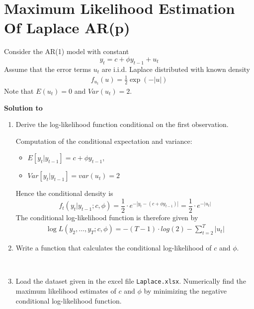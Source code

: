 \documentclass[a4paper]{scrartcl}
\begin{document}
    \section[Maximum Likelihood Estimation Of Laplace AR(p)]{Maximum Likelihood Estimation Of Laplace AR(p)}\label{ex:MLARpLaPlace}
    Consider the AR(1) model with constant
    $$ y_t = c + \phi y_{t-1} + u_t$$
    Assume that the error terms $u_t$ are i.i.d. Laplace distributed with known density
    \begin{align*}
        f_{u_{t}}(u)=\frac{1}{2}\exp \left( -|u|\right)
    \end{align*}
    Note that $E(u_t)=0$ and $Var(u_t)=2$.
    \begin{solution}\textbf{Solution to }\end{solution}
    \begin{enumerate}
        \item Derive the log-likelihood function conditional on the first observation.
              \begin{solution}
                  Computation of the conditional expectation and variance:
                  \begin{itemize}
                      \item $E[y_{t}|y_{t-1}] =
                                c + \phi y_{t-1} $,
                      \item $Var[y_{t}|y_{t-1}] = var(u_t) = 2$
                  \end{itemize}
                  Hence the conditional density is
                  \begin{displaymath}
                      f_t(y_{t}|y_{t-1}; c, \phi) = \frac{1}{2} \cdot e^{-|y_{t} -(c + \phi y_{t-1})|} = \frac{1}{2} \cdot e^{-|u_t|}
                  \end{displaymath}
                  The conditional log-likelihood function is therefore given by
                  \begin{eqnarray*}
                      \log L(y_{2}, \dots, y_{T};c, \phi) 
                      =-(T-1) \cdot log(2) - \sum_{t=2}^{T} |u_{t}|
                  \end{eqnarray*}
              \end{solution}
        \item Write a function that calculates the conditional log-likelihood of $c$ and $\phi$.
              \begin{solution}~
                  
              \end{solution}
        \item Load the dataset given in the excel file \texttt{Laplace.xlsx}. Numerically find the maximum likelihood estimates of $c$ and $\phi$ by minimizing the negative conditional log-likelihood function.
              \begin{solution}~
              \end{solution}
              

\end{enumerate}
\end{document}
